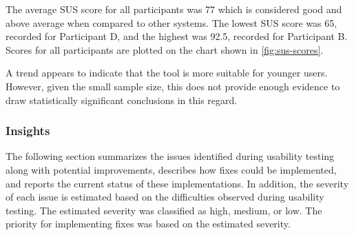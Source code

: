The average SUS score for all participants was 77 which is considered good and above average when compared to other systems. The lowest SUS score was 65, recorded for Participant D, and the highest was 92.5, recorded for Participant B. Scores for all participants are plotted on the chart shown in \autoref{fig:sus-scores}.

A trend appears to indicate that the tool is more suitable for younger users. However, given the small sample size, this does not provide enough evidence to draw statistically significant conclusions in this regard.

\subsubsection{Insights}

The following section summarizes the issues identified during usability testing along with potential improvements, describes how fixes could be implemented, and reports the current status of these implementations. In addition, the severity of each issue is estimated based on the difficulties observed during usability testing. The estimated severity was classified as high, medium, or low. The priority for implementing fixes was based on the estimated severity.

